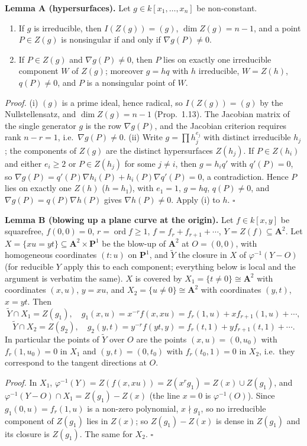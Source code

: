 \documentclass[11pt]{article}
\begin{document}
\textbf{Lemma A (hypersurfaces).} Let $g\in k[x_1,\dots,x_n]$ be non-constant.
\begin{enumerate}[label=(\roman*),leftmargin=*]
\item If $g$ is irreducible, then $I(Z(g))=(g)$, $\dim Z(g)=n-1$, and a point $P\in Z(g)$ is nonsingular if and only if $\nabla g(P)\neq 0$.
\item If $P\in Z(g)$ and $\nabla g(P)\neq0$, then $P$ lies on exactly one irreducible component $W$ of $Z(g)$; moreover $g=hq$ with $h$ irreducible, $W=Z(h)$, $q(P)\neq 0$, and $P$ is a nonsingular point of $W$.
\end{enumerate}
\emph{Proof.} (i) $(g)$ is a prime ideal, hence radical, so $I(Z(g))=(g)$ by the Nullstellensatz, and $\dim Z(g)=n-1$ (Prop.~1.13). The Jacobian matrix of the single generator $g$ is the row $\nabla g(P)$, and the Jacobian criterion requires rank $n-r=1$, i.e.\ $\nabla g(P)\ne 0$. (ii) Write $g=\prod h_j^{e_j}$ with distinct irreducible $h_j$; the components of $Z(g)$ are the distinct hypersurfaces $Z(h_j)$. If $P\in Z(h_i)$ and either $e_i\ge2$ or $P\in Z(h_j)$ for some $j\ne i$, then $g=h_iq'$ with $q'(P)=0$, so $\nabla g(P)=q'(P)\nabla h_i(P)+h_i(P)\nabla q'(P)=0$, a contradiction. Hence $P$ lies on exactly one $Z(h)$ ($h=h_1$), with $e_1=1$, $g=hq$, $q(P)\neq0$, and $\nabla g(P)=q(P)\nabla h(P)$ gives $\nabla h(P)\neq0$. Apply (i) to $h$. \hfill$\square$

\textbf{Lemma B (blowing up a plane curve at the origin).} Let $f\in k[x,y]$ be squarefree, $f(0,0)=0$, $r=\operatorname{ord} f\ge1$, $f=f_r+f_{r+1}+\cdots$, $Y=Z(f)\subseteq\mathbf A^2$. Let $X=\{xu=yt\}\subseteq \mathbf A^2\times\mathbf P^1$ be the blow-up of $\mathbf A^2$ at $O=(0,0)$, with homogeneous coordinates $(t:u)$ on $\mathbf P^1$, and $\widetilde Y$ the closure in $X$ of $\varphi^{-1}(Y-O)$ (for reducible $Y$ apply this to each component; everything below is local and the argument is verbatim the same). $X$ is covered by $X_1=\{t\neq0\}\cong\mathbf A^2$ with coordinates $(x,u)$, $y=xu$, and $X_2=\{u\ne0\}\cong\mathbf A^2$ with coordinates $(y,t)$, $x=yt$. Then
\[
\widetilde Y\cap X_1=Z(g_1),\quad g_1(x,u)=x^{-r}f(x,xu)=f_r(1,u)+xf_{r+1}(1,u)+\cdots,
\]
\[
\widetilde Y\cap X_2=Z(g_2),\quad g_2(y,t)=y^{-r}f(yt,y)=f_r(t,1)+yf_{r+1}(t,1)+\cdots .
\]
In particular the points of $\widetilde Y$ over $O$ are the points $(x,u)=(0,u_0)$ with $f_r(1,u_0)=0$ in $X_1$ and $(y,t)=(0,t_0)$ with $f_r(t_0,1)=0$ in $X_2$, i.e.\ they correspond to the tangent directions at $O$.

\emph{Proof.} In $X_1$, $\varphi^{-1}(Y)=Z(f(x,xu))=Z(x^rg_1)=Z(x)\cup Z(g_1)$, and $\varphi^{-1}(Y-O)\cap X_1=Z(g_1)-Z(x)$ (the line $x=0$ is $\varphi^{-1}(O)$). Since $g_1(0,u)=f_r(1,u)$ is a non-zero polynomial, $x\nmid g_1$, so no irreducible component of $Z(g_1)$ lies in $Z(x)$; so $Z(g_1)-Z(x)$ is dense in $Z(g_1)$ and its closure is $Z(g_1)$. The same for $X_2$. \hfill$\square$
\end{document}
